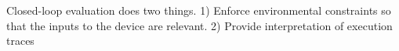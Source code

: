 Closed-loop evaluation does two things. 1) Enforce environmental constraints so that the inputs to the device are relevant. 2) Provide interpretation of execution traces 
